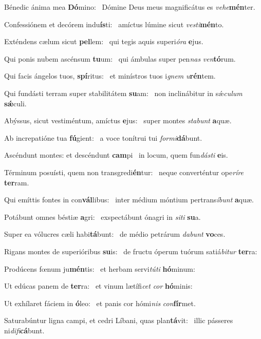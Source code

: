 \item Bénedic ánima mea \textbf{Dó}mino:~\psstar{} Dómine Deus meus magnificátus es \textit{vehe}\textbf{mén}ter.
\item Confessiónem et decórem indu\textbf{ís}ti:~\psstar{} amíctus lúmine sicut \textit{vesti}\textbf{mén}to.
\item Exténdens cælum sicut \textbf{pel}lem:~\psstar{} qui tegis aquis superi\textit{óra} \textbf{e}jus.
\item Qui ponis nubem ascénsum \textbf{tu}um:~\psstar{} qui ámbulas super pen\textit{nas} \textit{ven}\textbf{tó}rum.
\item Qui facis ángelos tuos, \textbf{spí}ritus:~\psstar{} et minístros tuos i\textit{gnem} \textit{u}\textbf{rén}tem.
\item Qui fundásti terram super stabilitátem \textbf{su}am:~\psstar{} non inclinábitur in sǽ\textit{culum} \textbf{sǽ}culi.
\item Abýssus, sicut vestiméntum, amíctus \textbf{e}jus:~\psstar{} super montes \textit{stabunt} \textbf{a}quæ.
\item Ab increpatióne tua \textbf{fú}gient:~\psstar{} a voce tonítrui tui \textit{formi}\textbf{dá}bunt.
\item Ascéndunt montes: et descéndunt \textbf{cam}pi~\psstar{} in locum, quem fun\textit{dásti} \textbf{e}is.
\item Términum posuísti, quem non transgredi\textbf{én}tur:~\psstar{} neque converténtur ope\textit{ríre} \textbf{ter}ram.
\item Qui emíttis fontes in con\textbf{vál}libus:~\psstar{} inter médium móntium pertrans\textit{íbunt} \textbf{a}quæ.
\item Potábunt omnes béstiæ \textbf{a}gri:~\psstar{} exspectábunt ónagri in \textit{siti} \textbf{su}a.
\item Super ea vólucres cæli habi\textbf{tá}bunt:~\psstar{} de médio petrárum \textit{dabunt} \textbf{vo}ces.
\item Rigans montes de superióribus \textbf{su}is:~\psstar{} de fructu óperum tuórum satiá\textit{bitur} \textbf{ter}ra:
\item Prodúcens fœnum ju\textbf{mén}tis:~\psstar{} et herbam servi\textit{túti} \textbf{hó}minum:
\item Ut edúcas panem de \textbf{ter}ra:~\psstar{} et vinum lætífi\textit{cet} \textit{cor} \textbf{hó}minis:
\item Ut exhílaret fáciem in \textbf{ó}leo:~\psstar{} et panis cor hómi\textit{nis} \textit{con}\textbf{fír}met.
\item Saturabúntur ligna campi, et cedri Líbani, quas plan\textbf{tá}vit:~\psstar{} illic pásseres ni\textit{difi}\textbf{cá}bunt.
